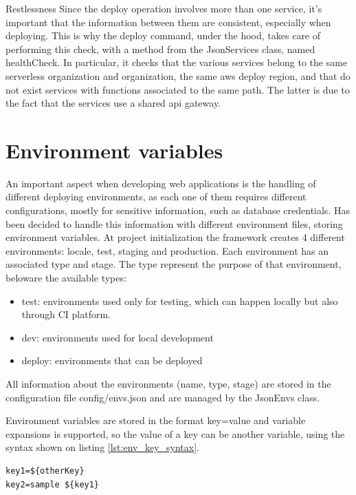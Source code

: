\begin{chapter}{Restlessness}
    Since the deploy operation involves more than one service, it's important that
    the information between them are consistent, especially when deploying. This is
    why the deploy command, under the hood, takes care of performing this check,
    with a method from the JsonServices class, named healthCheck.
    In particular, it checks that the various services belong to the same serverless
    organization and organization, the same aws deploy region, and that do not exist
    services with functions associated to the same path. The latter is due to the fact
    that the services use a shared api gateway.

    \section{Environment variables}
    \label{sec:env_vars}
    An important aspect when developing web applications is the handling of different
    deploying environments, as each one of them requires different configurations,
    mostly for sensitive information, such as database credentials.
    Has been decided to handle this information with different environment files,
    storing environment variables.
    At project initialization the framework creates 4 different environments: locale,
    test, staging and production. Each environment has an associated type and stage.
    The type represent the purpose of that environment, beloware the available types:
    \begin{itemize}
        \item test: environments used only for testing, which can happen locally
            but also through CI platform.
        \item dev: environments used for local development
        \item deploy: environments that can be deployed
    \end{itemize}
    All information about the environments (name, type, stage) are stored in the
    configuration file config/envs.json and are managed by the JsonEnvs class.

    Environment variables are stored in the format key=value and variable expansions
    is supported, so the value of a key can be another variable, using the syntax
    shown on listing \ref{lst:env_key_syntax}.

    \begin{lstlisting}[caption=Environment variable syntax, label={lst:env_key_syntax}]
key1=${otherKey}
key2=sample ${key1}
    \end{lstlisting}


\end{chapter}
